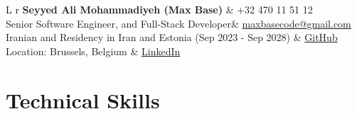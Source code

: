 \documentclass[a4paper,10pt]{article}
\makeatletter
\newcommand{\name}{Seyyed Ali Mohammadiyeh (Max Base)}
\newcommand{\course}{Senior Software Engineer, and Full-Stack Developer}
\newcommand{\phone}{+32 470 11 51 12}
\newcommand{\emaila}{maxbasecode@gmail.com}
\newcommand{\github}{BaseMax}
\newcommand{\linkedin}{maxbase}
\makeatother
\begin{document}
\selectfont
\begin{tabularx}{\linewidth}{L r}
	\textbf{\LARGE \name} & \phone\\
	
	\course &  \href{mailto:\emaila}{\emaila}\\
	{Iranian and Residency in Iran and Estonia (Sep 2023 - Sep 2028)} &  \href{https://github.com/\github}{GitHub} \\
	{Location: Brussels, Belgium} &
	\href{https://www.linkedin.com/in/\linkedin/}{LinkedIn}
\end{tabularx}

\vspace{-2mm}

\section{\textbf{Technical Skills}}
\end{document}
